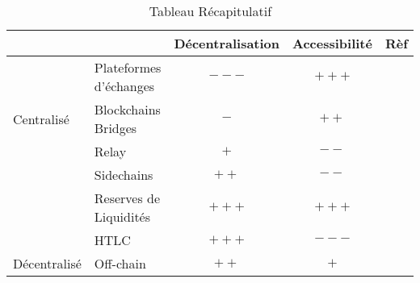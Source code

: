 \begin{table}[h!]
    \centering
    \caption{Tableau Récapitulatif}
    \begin{tabular}{|l|l|c|c|l|}
        \hline
                                   &                        & \multicolumn{1}{l}{Décentralisation}                   & \multicolumn{1}{l}{Accessibilité}                  & Rèf \\  \hline
                                   & Plateformes d'échanges & \cellcolor[HTML]{FD6864}$---$                          & \cellcolor[HTML]{9AFF99}$+++$ &     \\ \cline{2-5}
    \multirow{-2}{*}{Centralisé}   & Blockchains Bridges    & \cellcolor[HTML]{FD6864}$-$                            & \cellcolor[HTML]{9AFF99}$++$  &     \\ \hline
                                   & Relay                  & \cellcolor[HTML]{9AFF99}$+$                            & \cellcolor[HTML]{FD6864}$--$                         &     \\ \cline{2-5}
                                   & Sidechains             & \cellcolor[HTML]{9AFF99}$++$                           & \cellcolor[HTML]{FD6864}$--$                         &     \\ \cline{2-5}
                                   & Reserves de Liquidités & \cellcolor[HTML]{9AFF99}$+++$                          & \cellcolor[HTML]{9AFF99}$+++$ &     \\  \cline{2-5}
                                   & HTLC                   & \cellcolor[HTML]{9AFF99}$+++$                          & \cellcolor[HTML]{FD6864}$---$                        &     \\ \cline{2-5}
    \multirow{-5}{*}{Décentralisé} & Off-chain              & \cellcolor[HTML]{9AFF99}$++$                           & \cellcolor[HTML]{9AFF99}$+$   &    \\ \hline
    \end{tabular}
    \end{table}
